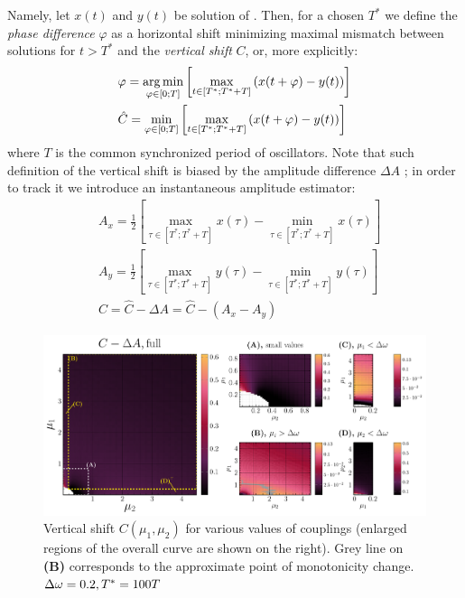 \documentclass{mynotes}
\begin{document}
Namely, let \( x(t) \) and \( y(t) \) be solution of . Then, 
for a chosen \( T^* \) we define the \emph{phase difference} \( \varphi \) as a horizontal shift minimizing maximal mismatch between solutions for \( t > T^* \) and the \emph{vertical shift} \( C \), or, more explicitly:
\begin{equation}
      \begin{aligned}
            & \varphi = \operatorname*{arg\,min}_{ \varphi \in [0; T] } \left[ \max_{ t \in [ T^*; T^* + T ] } \left(  x( t + \varphi ) - y( t )  \right) \right] \\
            & \hat C = \min_{ \varphi \in [0; T] } \left[ \max_{ t \in [ T^*; T^* + T ] } \left(  x( t + \varphi ) - y( t )  \right) \right] 
      \end{aligned}
\end{equation}
where \( T \) is the common synchronized period of oscillators. Note that such definition of the vertical shift is biased by the amplitude difference \( \Delta A \) ; in order to track it we introduce an instantaneous amplitude estimator:
\begin{equation}
      \begin{aligned}
            & A_x = \frac{1}{2} \left[ \max_{ \tau \in [T^*; T^* + T ] } x( \tau ) - \min_{ \tau \in [T^*; T^* + T ] } x( \tau ) \right] \\
            & A_y = \frac{1}{2} \left[ \max_{ \tau \in [T^*; T^* + T ] } y( \tau ) - \min_{ \tau \in [T^*; T^* + T ] } y( \tau ) \right] \\
            & C = \hat C - \Delta A = \hat C - \left( A_x - A_y \right)
      \end{aligned}
\end{equation}

\begin{figure}[h!]
      \vspace{-10pt}
      \centering
      \includegraphics[width = 1.0\columnwidth]{figures/vertshift_heatmap.pdf}
      \caption{
            Vertical shift \( C(\mu_1, \mu_2 )\) for various values of couplings (enlarged regions of the overall curve are shown on the right). Grey line on \textbf{(B)} corresponds to the approximate point of monotonicity change. \( \Delta\omega = 0.2, T^* = 100 T  \) \label{fig:C_hm}
      }
\end{figure}
\end{document}
